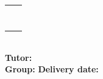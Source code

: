 \begin{tabular}{ll}
	\Studi    \hspace*{30pt} & \Studix   \\
	\Studii   \hspace*{30pt} & \Studx   \\
	\Studiii  \hspace*{30pt} & \Studxi   \\
	\Studiv   \hspace*{30pt} & \Studxii \\
	\Studv    \hspace*{30pt} & \Studxiii    \\
	\Studvi   \hspace*{30pt} & \Studxiv  \\
	\Studvii  \hspace*{30pt} & \Studxv  \\
	\Studviii \hspace*{30pt} & \Studxvi  \\
\end{tabular}\\

\vspace{10pt}
\textbf{Tutor:} \Director\\

\vspace{10pt}
\textbf{Group:} \Group \hspace*{160pt} \textbf{Delivery date:} \DocDate
